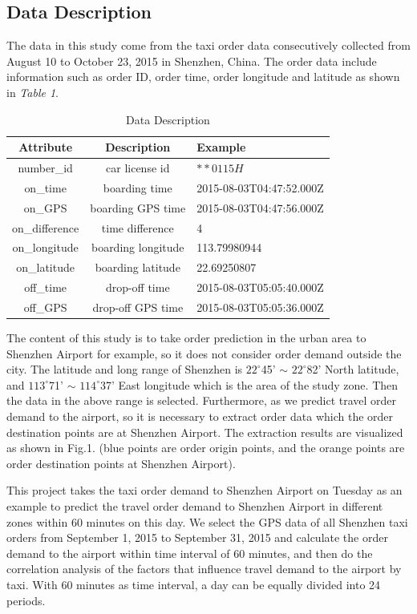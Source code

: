 \documentclass[sigconf]{acmart}
\begin{document}
\subsection{Data Description}
The data in this study come from the taxi order data consecutively collected from August 10 to October 23, 2015 in Shenzhen, China. The order data include information such as order ID, order time, order longitude and latitude as shown in \textit{Table 1}.
\begin{table}
  \caption{Data Description}
  \label{tab:freq}
  \begin{tabular}{ccl}
    \toprule
    Attribute&Description&Example\\
    \midrule
    number\_id&car license id& $\ast \ast 0115H$ \\
    on\_time&boarding time& 2015-08-03T04:47:52.000Z \\
    on\_GPS&boarding GPS time& 2015-08-03T04:47:56.000Z \\
    on\_difference&time difference& 4 \\
    on\_longitude&boarding longitude& 113.79980944 \\
    on\_latitude&boarding latitude& 22.69250807 \\
    off\_time&drop-off time& 2015-08-03T05:05:40.000Z \\
    off\_GPS&drop-off GPS time& 2015-08-03T05:05:36.000Z \\
  \bottomrule
\end{tabular}
\end{table}
The content of this study is to take order prediction in the urban area to Shenzhen Airport for example, so it does not consider order demand outside the city. The latitude and long range of Shenzhen is $22^{\circ}$45’ $\sim$ $22^{\circ}$82’ North latitude, and $113^{\circ}$71' $\sim$ $114^{\circ}$37' East longitude which is the area of the study zone. Then the data in the above range is selected. Furthermore, as we predict travel order demand to the airport, so it is necessary to extract order data which the order destination points are at Shenzhen Airport. The extraction results are visualized as shown in Fig.1. (blue points are order origin points, and the orange points are order destination points at Shenzhen Airport).

This project takes the taxi order demand to Shenzhen Airport on Tuesday as an example to predict the travel order demand to Shenzhen Airport in different zones within 60 minutes on this day. We select the GPS data of all Shenzhen taxi orders from September 1, 2015 to September 31, 2015 and calculate the order demand to the airport within time interval of 60 minutes, and then do the correlation analysis of the factors that influence travel demand to the airport by taxi. With 60 minutes as time interval, a day can be equally divided into 24 periods.
\end{document}
